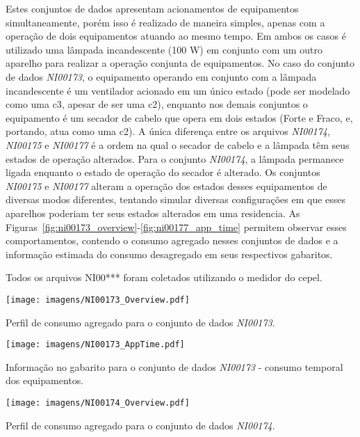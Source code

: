 Estes conjuntos de dados apresentam acionamentos de equipamentos
simultaneamente, porém isso é realizado de maneira simples, apenas com
a operação de dois equipamentos atuando ao mesmo tempo. Em ambos os
casos é utilizado uma lâmpada incandescente (100 W) em conjunto com um
outro aparelho para realizar a operação conjunta de equipamentos. No
caso do conjunto de dados \emph{NI00173}, o equipamento operando em
conjunto com a lâmpada incandescente é um ventilador acionado em um
único estado (pode ser modelado como uma \acs{c3}, apesar de ser uma
\acs{c2}), enquanto nos demais conjuntos o equipamento é um secador de
cabelo que opera em dois estados (Forte e Fraco, e, portando, atua
como uma \acs{c2}). A única diferença entre os arquivos
\emph{NI00174}, \emph{NI00175} e \emph{NI00177} é a ordem na qual o
secador de cabelo e a lâmpada têm seus estados de operação alterados.
Para o conjunto \emph{NI00174}, a lâmpada permanece ligada enquanto o
estado de operação do secador é alterado.  Os conjuntos \emph{NI00175}
e \emph{NI00177} alteram a operação dos estados desses equipamentos de
diversas modos diferentes, tentando simular diversas configurações em
que esses aparelhos poderiam ter seus estados alterados em uma
residencia. As
Figuras~\ref{fig:ni00173_overview}-\ref{fig:ni00177_app_time} permitem
observar esses comportamentos, contendo o consumo agregado nesses
conjuntos de dados e a informação estimada do consumo desagregado em
seus respectivos gabaritos.

Todos os arquivos NI00*** foram coletados utilizando o medidor do
\acs{cepel}.


\begin{SidewaysFigure}
\centering
\texttt{[image: imagens/NI00173\_Overview.pdf]}
\caption{Perfil de consumo agregado para o conjunto de dados
\emph{NI00173}.}
\label{fig:ni00173_overview}
\end{SidewaysFigure}

\begin{SidewaysFigure}
\centering
\texttt{[image: imagens/NI00173\_AppTime.pdf]}
\caption{Informação no gabarito para o conjunto de dados
\emph{NI00173} - consumo temporal dos equipamentos.}
\label{fig:ni00173_app_time}
\end{SidewaysFigure}

\begin{SidewaysFigure}
\centering
\texttt{[image: imagens/NI00174\_Overview.pdf]}
\caption{Perfil de consumo agregado para o conjunto de dados
\emph{NI00174}.}
\label{fig:ni00174_overview}
\end{SidewaysFigure}

